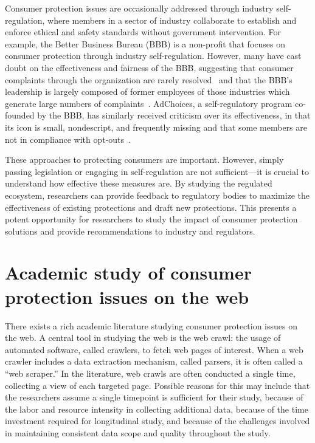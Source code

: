Consumer protection issues are occasionally addressed through industry self-regulation, where members in a sector of industry collaborate to establish and enforce ethical and safety standards without government intervention. For example, the Better Business Bureau (BBB) is a non-profit that focuses on consumer protection through industry self-regulation. However, many have cast doubt on the effectiveness and fairness of the BBB, suggesting that consumer complaints through the organization are rarely resolved~\cite{fisher1999dissatisfied} and that the BBB's leadership is largely composed of former employees of those industries which generate large numbers of complaints~\cite{garrett2007debate}. AdChoices, a self-regulatory program co-founded by the BBB, has similarly received criticism over its effectiveness, in that its icon is small, nondescript, and frequently missing and that some members are not in compliance with opt-outs~\cite{hernandez2011tracking,garlach2018m,komanduri2011adchoices}.

These approaches to protecting consumers are important. However, simply passing legislation or engaging in self-regulation are not sufficient---it is crucial to understand how effective these measures are. By studying the regulated ecosystem, researchers can provide feedback to regulatory bodies to maximize the effectiveness of existing protections and draft new protections. This presents a potent opportunity for researchers to study the impact of consumer protection solutions and provide recommendations to industry and regulators.



\section{Academic study of consumer protection issues on the web}
There exists a rich academic literature studying consumer protection issues on the web. A central tool in studying the web is the web crawl: the usage of automated software, called crawlers, to fetch web pages of interest. When a web crawler includes a data extraction mechanism, called parsers, it is often called a ``web scraper.'' In the literature, web crawls are often conducted a single time, collecting a view of each targeted page. Possible reasons for this may include that the researchers assume a single timepoint is sufficient for their study, because of the labor and resource intensity in collecting additional data, because of the time investment required for longitudinal study, and because of the challenges involved in maintaining consistent data scope and quality throughout the study.


